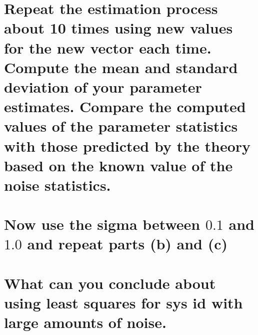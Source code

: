 \documentclass[12pt,letterpaper, onecolumn]{exam}
\begin{document}
\begin{questions}
\begin{parts}
\begin{subparts}
            \solution{}


            \solution{}


            \solution{}


            \solution{}
        \end{subparts}


        \part{Repeat the estimation process about 10 times using new values for the new vector each time. Compute the mean and standard deviation of your parameter estimates. Compare the computed values of the parameter statistics with those predicted by the theory based on the known value of the noise statistics.}
        \solution{}

        \part{Now use the sigma between $0.1$ and $1.0$ and repeat parts (b) and (c)}

        \solution{}

        \part{What can you conclude about using least squares for sys id with large amounts of noise.}


\end{parts}
\end{questions}
\end{document}
